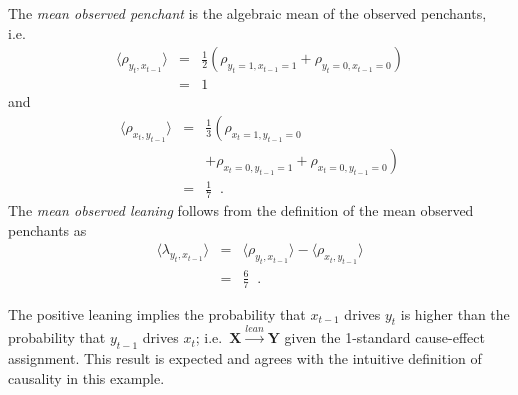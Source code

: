 \documentclass[twocolumn,aps,pre,groupedaddress]{revtex4-1}
\begin{document}
The {\em mean observed penchant} is the algebraic mean of the observed penchants, i.e.\
\begin{eqnarray*}
\langle \rho_{y_t,x_{t-1}} \rangle &=& \frac{1}{2}\left(\rho_{y_t=1,x_{t-1}=1} + \rho_{y_t=0,x_{t-1}=0}\right)\\
&=& 1
\end{eqnarray*}
and
\begin{eqnarray*}
\langle \rho_{x_t,y_{t-1}} \rangle &=& \frac{1}{3}\left(\rho_{x_t=1,y_{t-1}=0} \right.\\
& &\left. +\rho_{x_t=0,y_{t-1}=1} + \rho_{x_t=0,y_{t-1}=0}\right)\\
&=& \frac{1}{7}\;\;.
\end{eqnarray*}
The {\em mean observed leaning} follows from the definition of the mean observed penchants as
\begin{eqnarray}
\label{eqn:meanlean}
\langle \lambda_{y_t,x_{t-1}} \rangle &=& \langle \rho_{y_t,x_{t-1}} \rangle - \langle \rho_{x_t,y_{t-1}} \rangle\\
&=& \frac{6}{7}\;\;.
\end{eqnarray}

The positive leaning implies the probability that $x_{t-1}$ drives $y_t$ is higher than the probability that $y_{t-1}$ drives $x_{t}$; i.e.\ $\mathbf{X}\xrightarrow{lean}\mathbf{Y}$ given the 1-standard cause-effect assignment.  This result is expected and agrees with the intuitive definition of causality in this example.  
\end{document}
